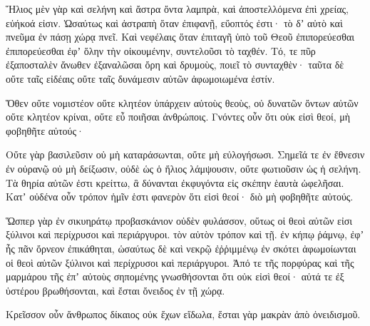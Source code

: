 {\par }{\PP {}Ἥλιος μὲν γὰρ καὶ σελήνη καὶ ἄστρα ὄντα λαμπρὰ, καὶ ἀποστελλόμενα ἐπὶ χρείας, εὐήκοά εἰσιν.
Ὡσαύτως καὶ ἀστραπὴ ὅταν ἐπιφανῇ, εὔοπτός ἐστι· τὸ δʼ αὐτὸ καὶ πνεῦμα ἐν πάσῃ χώρᾳ πνεῖ.
Καὶ νεφέλαις ὅταν ἐπιταγῆ ὑπὸ τοῦ Θεοῦ ἐπιπορεύεσθαι ἐπιπορεύεσθαι ἐφʼ ὅλην τὴν οἰκουμένην, συντελοῦσι τὸ ταχθέν.
Τό, τε πῦρ ἐξαποσταλὲν ἄνωθεν ἐξαναλῶσαι ὄρη καὶ δρυμοὺς, ποιεῖ τὸ συνταχθὲν· ταῦτα δὲ οὔτε ταῖς εἰδέαις οὔτε ταῖς δυνάμεσιν αὐτῶν ἀφωμοιωμένα ἐστίν.
\par }{\PP {}Ὅθεν οὔτε νομιστέον οὔτε κλητέον ὑπάρχειν αὐτοὺς θεοὺς, οὐ δυνατῶν ὄντων αὐτῶν οὔτε κλητέον κρίναι, οὔτε εὖ ποιῆσαι ἀνθρώποις.
Γνόντες οὖν ὅτι οὐκ εἰσὶ θεοί, μὴ φοβηθῆτε αὐτούς·
\par }{\PP {}Οὔτε γὰρ βασιλεῦσιν οὐ μὴ καταράσωνται, οὔτε μὴ εὐλογήσωσι.
Σημεῖά τε ἐν ἔθνεσιν ἐν οὐρανῷ οὐ μὴ δείξωσιν, οὐδὲ ὡς ὁ ἥλιος λάμψουσιν, οὔτε φωτιοῦσιν ὡς ἡ σελήνη.
Τὰ θηρία αὐτῶν ἐστι κρείττω, ἃ δύνανται ἐκφυγόντα εἰς σκέπην ἑαυτὰ ὠφελῆσαι.
Κατʼ οὐδένα οὖν τρόπον ἡμῖν ἑστι φανερὸν ὅτι εἰσὶ θεοί· διὸ μὴ φοβηθῆτε αὐτούς.
\par }{\PP {}Ὥσπερ γὰρ ἐν σικυηράτῳ προβασκάνιον οὐδὲν φυλάσσον, οὕτως οἱ θεοὶ αὐτῶν εἰσι ξύλινοι καὶ περίχρυσοι καὶ περιάργυροι.
τὸν αὐτὸν τρόπον καὶ τῇ. ἐν κήπῳ ῥάμνῳ, ἐφʼ ἧς πᾶν ὄρνεον ἐπικάθηται, ὡσαύτως δὲ καὶ νεκρῷ ἐῤῥιμμένῳ ἐν σκότει ἀφωμοίωνται οἱ θεοὶ αὐτῶν ξύλινοι καὶ περίχρυσοι καὶ περιάργυροι.
Ἀπό τε τῆς πορφύρας καὶ τῆς μαρμάρου τῆς ἐπʼ αὐτοὺς σηπομένης γνωσθήσονται ὅτι οὐκ εἰσὶ θεοί· αὐτά τε ἐξ ὑστέρου βρωθήσονται, καὶ ἔσται ὄνειδος ἐν τῇ χώρᾳ.
\par }{\PP {}Κρεῖσσον οὖν ἄνθρωπος δίκαιος οὐκ ἔχων εἴδωλα, ἔσται γὰρ μακρὰν ἀπὸ ὀνειδισμοῦ.
\par }